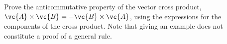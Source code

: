Prove the anticommutative property of the vector cross
product, $\vc{A}\times\vc{B} = -\vc{B}\times\vc{A}$,
using the expressions for the components
of the cross product. Note that giving an example does not
constitute a proof of a general rule.
